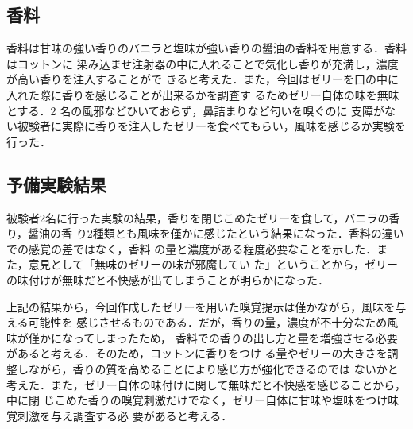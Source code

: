\subsection{香料}

香料は甘味の強い香りのバニラと塩味が強い香りの醤油の香料を用意する．香料はコットンに
染み込ませ注射器の中に入れることで気化し香りが充満し，濃度が高い香りを注入することがで
きると考えた．また，今回はゼリーを口の中に入れた際に香りを感じることが出来るかを調査す
るためゼリー自体の味を無味とする．2 名の風邪などひいておらず，鼻詰まりなど匂いを嗅ぐのに
支障がない被験者に実際に香りを注入したゼリーを食べてもらい，風味を感じるか実験を行った．


\subsection{予備実験結果}

被験者2名に行った実験の結果，香りを閉じこめたゼリーを食して，バニラの香り，醤油の香
り2種類とも風味を僅かに感じたという結果になった．香料の違いでの感覚の差ではなく，香料
の量と濃度がある程度必要なことを示した．また，意見として「無味のゼリーの味が邪魔してい
た」ということから，ゼリーの味付けが無味だと不快感が出てしまうことが明らかになった．


上記の結果から，今回作成したゼリーを用いた嗅覚提示は僅かながら，風味を与える可能性を
感じさせるものである．だが，香りの量，濃度が不十分なため風味が僅かになってしまったため，
香料での香りの出し方と量を増強させる必要があると考える．そのため，コットンに香りをつけ
る量やゼリーの大きさを調整しながら，香りの質を高めることにより感じ方が強化できるのでは
ないかと考えた．また，ゼリー自体の味付けに関して無味だと不快感を感じることから，中に閉
じこめた香りの嗅覚刺激だけでなく，ゼリー自体に甘味や塩味をつけ味覚刺激を与え調査する必
要があると考える．
